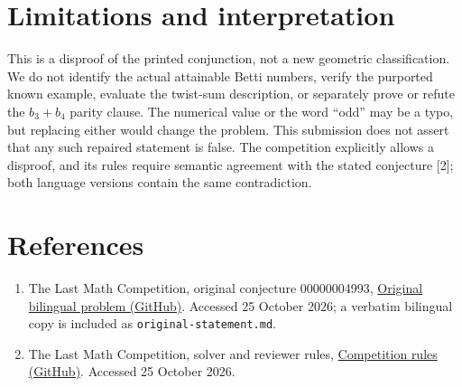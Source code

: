 \documentclass[11pt]{article}
\begin{document}
\section{Limitations and interpretation}
This is a disproof of the printed conjunction, not a new geometric
classification. We do not identify the actual attainable Betti numbers, verify
the purported known example, evaluate the twist-sum description, or separately
prove or refute the $b_3+b_4$ parity clause. The numerical value or the word
``odd'' may be a typo, but replacing either would change the problem. This
submission does not assert that any such repaired statement is false. The
competition explicitly allows a disproof, and its rules require semantic
agreement with the stated conjecture [2]; both language versions contain the
same contradiction.

\section*{References}
\begin{enumerate}
\item The Last Math Competition, original conjecture 00000004993,
\href{https://github.com/The-Last-Math-Competition/The-Last-Math-Competition/blob/main/conjectures/00000004993.md}{Original bilingual problem (GitHub)}.
Accessed 25 October 2026; a verbatim bilingual copy is included as
\texttt{original-statement.md}.
\item The Last Math Competition, solver and reviewer rules,
\href{https://github.com/The-Last-Math-Competition/The-Last-Math-Competition/blob/main/README.md}{Competition rules (GitHub)}.
Accessed 25 October 2026.
\end{enumerate}
\end{document}
